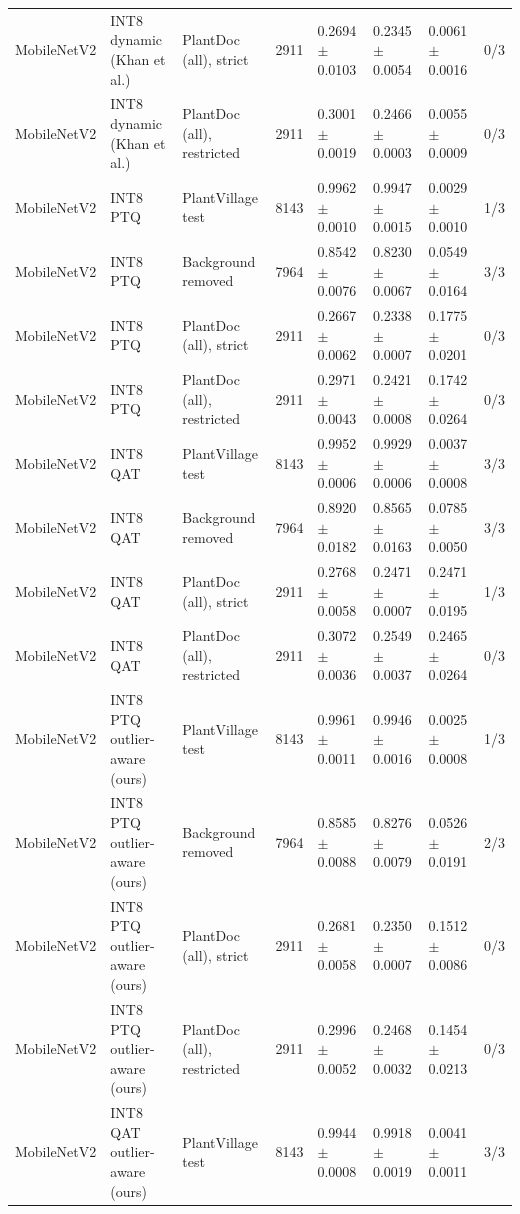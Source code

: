 \begin{table}[t]
\begin{tabular}{llllllll}
MobileNetV2 & INT8 dynamic (Khan et al.) & PlantDoc (all), strict & 2911 & 0.2694 $\pm$ 0.0103 & 0.2345 $\pm$ 0.0054 & 0.0061 $\pm$ 0.0016 & 0/3 \\
MobileNetV2 & INT8 dynamic (Khan et al.) & PlantDoc (all), restricted & 2911 & 0.3001 $\pm$ 0.0019 & 0.2466 $\pm$ 0.0003 & 0.0055 $\pm$ 0.0009 & 0/3 \\
MobileNetV2 & INT8 PTQ & PlantVillage test & 8143 & 0.9962 $\pm$ 0.0010 & 0.9947 $\pm$ 0.0015 & 0.0029 $\pm$ 0.0010 & 1/3 \\
MobileNetV2 & INT8 PTQ & Background removed & 7964 & 0.8542 $\pm$ 0.0076 & 0.8230 $\pm$ 0.0067 & 0.0549 $\pm$ 0.0164 & 3/3 \\
MobileNetV2 & INT8 PTQ & PlantDoc (all), strict & 2911 & 0.2667 $\pm$ 0.0062 & 0.2338 $\pm$ 0.0007 & 0.1775 $\pm$ 0.0201 & 0/3 \\
MobileNetV2 & INT8 PTQ & PlantDoc (all), restricted & 2911 & 0.2971 $\pm$ 0.0043 & 0.2421 $\pm$ 0.0008 & 0.1742 $\pm$ 0.0264 & 0/3 \\
MobileNetV2 & INT8 QAT & PlantVillage test & 8143 & 0.9952 $\pm$ 0.0006 & 0.9929 $\pm$ 0.0006 & 0.0037 $\pm$ 0.0008 & 3/3 \\
MobileNetV2 & INT8 QAT & Background removed & 7964 & 0.8920 $\pm$ 0.0182 & 0.8565 $\pm$ 0.0163 & 0.0785 $\pm$ 0.0050 & 3/3 \\
MobileNetV2 & INT8 QAT & PlantDoc (all), strict & 2911 & 0.2768 $\pm$ 0.0058 & 0.2471 $\pm$ 0.0007 & 0.2471 $\pm$ 0.0195 & 1/3 \\
MobileNetV2 & INT8 QAT & PlantDoc (all), restricted & 2911 & 0.3072 $\pm$ 0.0036 & 0.2549 $\pm$ 0.0037 & 0.2465 $\pm$ 0.0264 & 0/3 \\
MobileNetV2 & INT8 PTQ outlier-aware (ours) & PlantVillage test & 8143 & 0.9961 $\pm$ 0.0011 & 0.9946 $\pm$ 0.0016 & 0.0025 $\pm$ 0.0008 & 1/3 \\
MobileNetV2 & INT8 PTQ outlier-aware (ours) & Background removed & 7964 & 0.8585 $\pm$ 0.0088 & 0.8276 $\pm$ 0.0079 & 0.0526 $\pm$ 0.0191 & 2/3 \\
MobileNetV2 & INT8 PTQ outlier-aware (ours) & PlantDoc (all), strict & 2911 & 0.2681 $\pm$ 0.0058 & 0.2350 $\pm$ 0.0007 & 0.1512 $\pm$ 0.0086 & 0/3 \\
MobileNetV2 & INT8 PTQ outlier-aware (ours) & PlantDoc (all), restricted & 2911 & 0.2996 $\pm$ 0.0052 & 0.2468 $\pm$ 0.0032 & 0.1454 $\pm$ 0.0213 & 0/3 \\
MobileNetV2 & INT8 QAT outlier-aware (ours) & PlantVillage test & 8143 & 0.9944 $\pm$ 0.0008 & 0.9918 $\pm$ 0.0019 & 0.0041 $\pm$ 0.0011 & 3/3 \\

\end{tabular}
\end{table}
